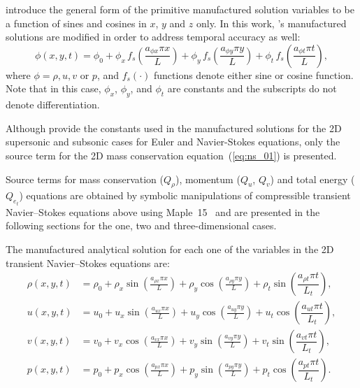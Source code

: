 \documentclass[10pt]{article}
\begin{document}
\citet{Roy2002} introduce the general form of the primitive manufactured solution variables to be  a function of sines and cosines in $x$, $y$ and $z$ only. In this work, \citet{Roy2002}'s manufactured solutions are modified in order to address temporal accuracy as well:
\begin{equation}
 \label{eq:manufactured01}
  \phi (x,y,t) = \phi_0+ \phi_x\, f_s \left(\frac{a_{\phi x} \pi x}{L} \right) +  \phi_y \,f_s\left(\frac{a_{\phi y} \pi y}{L}\right) +  \phi_t \,f_s\left(\frac{a_{\phi t} \pi t}{L}\right),
\end{equation}
where $\phi=\rho,u,v$ or $p$, and $f_s(\cdot)$ functions denote either sine or cosine function. Note that in this case, $\phi_x$, $\phi_y$,  and $\phi_t$ are constants  and the subscripts do not denote differentiation.



Although \citet{Roy2002} provide the constants used in the manufactured solutions for the 2D supersonic and subsonic cases for Euler and Navier-Stokes equations, only the source term for the 2D mass conservation equation~(\ref{eq:ns_01}) is presented.


Source terms  for mass conservation ($Q_\rho$), momentum ($Q_u$, $Q_v$)  and total energy ($Q_{e_t}$) equations are obtained by symbolic manipulations of compressible transient Navier--Stokes equations above using Maple~15~\citep{Maple15} and are presented in the following sections for the one, two and three-dimensional cases.


The manufactured analytical solution for each one of the variables in the 2D transient Navier--Stokes equations are:
\begin{equation}
\begin{split}
\label{eq:manufactured_3d} 
\rho\left( x ,y ,t\right) &=  \rho_{0}+ \rho_{x} \sin\left(\frac{a_{ \rho  x} \pi x}{L}\right)+ \rho_{y} \cos\left(\frac{a_{ \rho  y} \pi y}{L}\right)  + \rho_t \sin\left(\dfrac{a_{\rho t} \pi t}{L_t}\right),\\
%
u\left( x ,y ,t\right) &= u_{0}+u_{x} \sin\left(\frac{a_{u  x} \pi x}{L}\right)+u_{y} \cos\left(\frac{a_{u  y} \pi y}{L}\right) + u_t \cos\left(\dfrac{a_{u t} \pi t}{L_t}\right),\\
%
v\left( x ,y ,t\right) &= v_{0}+v_{x} \cos\left(\frac{a_{v  x} \pi x}{L}\right)+v_{y} \sin\left(\frac{a_{v  y} \pi y}{L}\right)+ v_t \sin\left(\dfrac{a_{v t} \pi t}{L_t}\right), \\
%
p\left( x ,y ,t\right) &= p_{0}+p_{x} \cos\left(\frac{a_{p  x} \pi x}{L}\right)+p_{y} \sin\left(\frac{a_{p  y} \pi y}{L}\right)+ p_t \cos\left(\dfrac{a_{p t} \pi t}{L_t}\right).
\end{split}
\end{equation}
\end{document}
